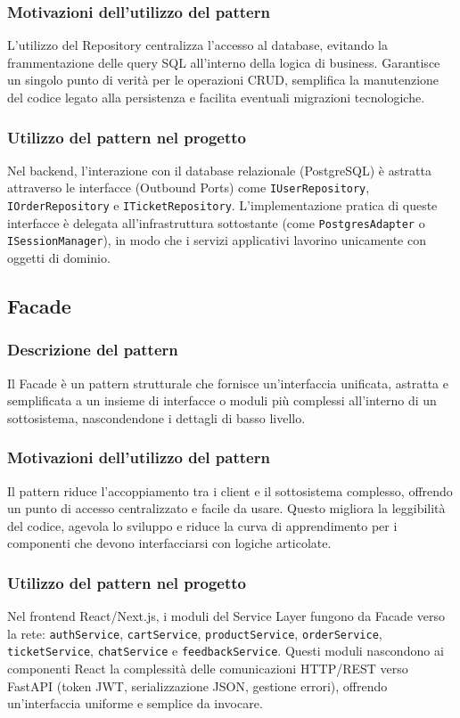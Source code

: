 \documentclass[a4paper, 11pt, oneside]{scrartcl}
\begin{document}
\subsubsection{Motivazioni dell'utilizzo del pattern}
L'utilizzo del Repository centralizza l'accesso al database, evitando la frammentazione delle query SQL all'interno della logica di business. Garantisce un singolo punto di verità per le operazioni CRUD, semplifica la manutenzione del codice legato alla persistenza e facilita eventuali migrazioni tecnologiche.

\subsubsection{Utilizzo del pattern nel progetto}
Nel backend, l'interazione con il database relazionale (PostgreSQL) è astratta attraverso le interfacce (Outbound Ports) come \texttt{IUserRepository}, \texttt{IOrderRepository} e \texttt{ITicketRepository}. L'implementazione pratica di queste interfacce è delegata all'infrastruttura sottostante (come \texttt{PostgresAdapter} o \texttt{ISessionManager}), in modo che i servizi applicativi lavorino unicamente con oggetti di dominio.

\subsection{Facade}

\subsubsection{Descrizione del pattern}
Il Facade è un pattern strutturale che fornisce un'interfaccia unificata, astratta e semplificata a un insieme di interfacce o moduli più complessi all'interno di un sottosistema, nascondendone i dettagli di basso livello.

\subsubsection{Motivazioni dell'utilizzo del pattern}
Il pattern riduce l'accoppiamento tra i client e il sottosistema complesso, offrendo un punto di accesso centralizzato e facile da usare. Questo migliora la leggibilità del codice, agevola lo sviluppo e riduce la curva di apprendimento per i componenti che devono interfacciarsi con logiche articolate.

\subsubsection{Utilizzo del pattern nel progetto}
Nel frontend React/Next.js, i moduli del Service Layer fungono da Facade verso la rete: \texttt{authService}, \texttt{cartService}, \texttt{productService}, \texttt{orderService}, \texttt{ticketService}, \texttt{chatService} e \texttt{feedbackService}. Questi moduli nascondono ai componenti React la complessità delle comunicazioni HTTP/REST verso FastAPI (token JWT, serializzazione JSON, gestione errori), offrendo un'interfaccia uniforme e semplice da invocare.
\end{document}
